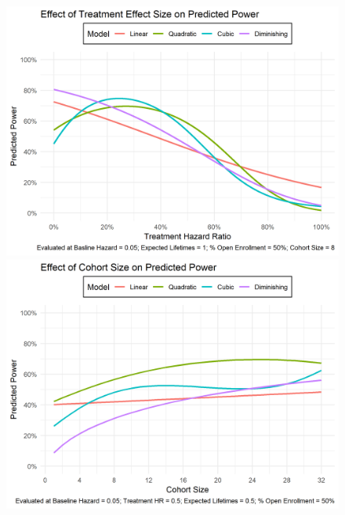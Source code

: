 \begin{figure}
\caption[Effect of Treatment Hazard Ratio on Power]{}
\label{fig:power-treatment-hr}
\includegraphics[width=\textwidth]{reports/figures/single-effects/power-treatment-hr.png}

\caption[Effect of Cohort Size on Power]{}
\label{fig:power-cohort-size}
\includegraphics[width=\textwidth]{reports/figures/single-effects/power-cohort-size.png}
\end{figure}

